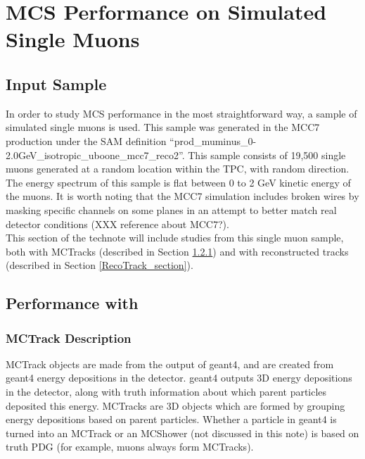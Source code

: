\section{MCS Performance on Simulated Single Muons}\label{singlemuon_MC_section}

\subsection{Input Sample}\label{SingleMu_Input_Sample_section}
In order to study MCS performance in the most straightforward way, a sample of simulated single muons is used. This sample was generated in the {\ub} MCC7 production under the SAM definition ``prod\_muminus\_0-2.0GeV\_isotropic\_uboone\_mcc7\_reco2''. This sample consists of 19,500 single muons generated at a random location within the {\ub} TPC, with random direction. The energy spectrum of this sample is flat between 0 to 2 GeV kinetic energy of the muons. It is worth noting that the MCC7 simulation includes broken wires by masking specific channels on some planes in an attempt to better match real detector conditions (XXX reference about MCC7?).\\

This section of the technote will include studies from this single muon sample, both with {\sc MCTracks} (described in Section \ref{MCTrack_section}) and with reconstructed tracks (described in Section \ref{RecoTrack_section}).

\subsection{Performance with }
\subsubsection{MCTrack Description}\label{MCTrack_section}
{\sc MCTrack} objects are made from the output of {\sc geant}4, and are created from {\sc geant}4 energy depositions in the detector. {\sc geant}4 outputs 3D energy depositions in the detector, along with truth information about which parent particles deposited this energy. {\sc MCTracks} are 3D objects which are formed by grouping energy depositions based on parent particles. Whether a particle in {\sc geant}4 is turned into an {\sc MCTrack} or an {\sc MCShower} (not discussed in this note) is based on truth PDG (for example, muons always form {\sc MCTracks}).\\

